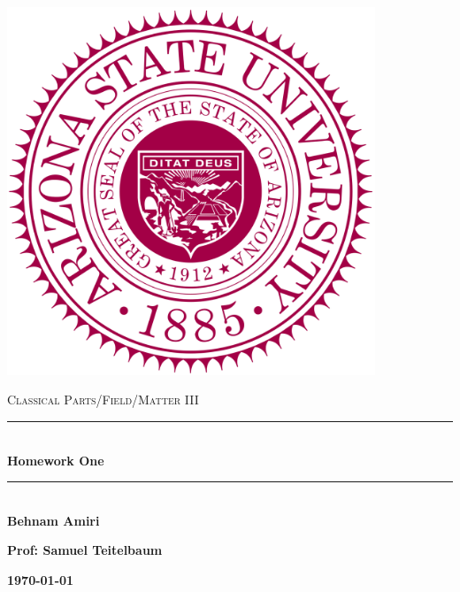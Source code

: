 \documentclass[fleqn]{article}
\begin{document}
  \begin{titlepage}

    \newcommand{\HRule}{\rule{\linewidth}{0.5mm}}

    \center

    \begin{center}
      \includegraphics[height=11cm, width=11cm]{asu.png}
    \end{center}

    \vline

    \textsc{\LARGE Classical Parts/Field/Matter III}\\[1.5cm]

    \HRule \\[0.5cm]
    { \huge \bfseries Homework One}\\[0.4cm] 
    \HRule \\[1.0cm]

    \textbf{Behnam Amiri}

    \bigbreak

    \textbf{Prof: Samuel Teitelbaum}

    \bigbreak

    \textbf{{\large \today}\\[2cm]}

    \vfill

  \end{titlepage}
\end{document}

